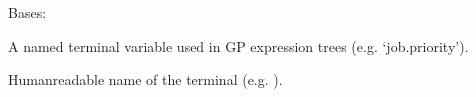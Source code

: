 \documentclass[letterpaper,10pt,english]{sphinxmanual}
\begin{document}
\begin{fulllineitems}
\label{\detokenize{api:scheduler.TerminalDef}}
\pysigstartsignatures
\pysigline
{}
\pysigstopsignatures
\sphinxAtStartPar
Bases: 

\sphinxAtStartPar
A named terminal variable used in GP expression trees (e.g. ‘job.priority’).

\begin{fulllineitems}
\label{\detokenize{api:scheduler.TerminalDef.name}}
\pysigstartsignatures
\pysigline
{}
\pysigstopsignatures
\sphinxAtStartPar
Human\sphinxhyphen{}readable name of the terminal (e.g. ).

\end{fulllineitems}


\end{fulllineitems}

\end{document}

